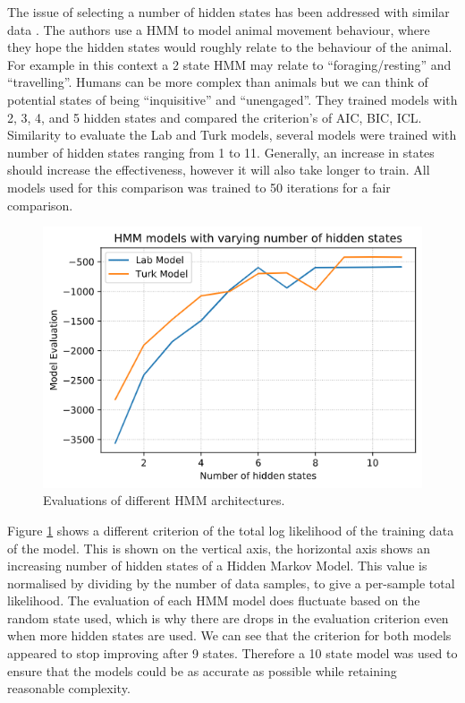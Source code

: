 \documentclass{article}
\begin{document}
The issue of selecting a number of hidden states has been addressed with similar data \cite{pohle2017selecting}.
The authors use a HMM to model animal movement behaviour, where they hope the hidden states would roughly relate to the behaviour of the animal.
For example in this context a 2 state HMM may relate to ``foraging/resting'' and ``travelling''.
Humans can be more complex than animals but we can think of potential states of being ``inquisitive'' and ``unengaged''.
They trained models with 2, 3, 4, and 5 hidden states and compared the criterion's of AIC, BIC, ICL.
Similarity to evaluate the Lab and Turk models, several models were trained with number of hidden states ranging from 1 to 11.
Generally, an increase in states should increase the effectiveness, however it will also take longer to train.
All models used for this comparison was trained to 50 iterations for a fair comparison. 

\begin{figure}[ht]
    \centering
    \includegraphics[scale=0.55]{Images/ModelEvaluation.png}
    \caption{Evaluations of different HMM architectures.}
    \label{fig:ModleEval}
\end{figure}

Figure \ref{fig:ModleEval} shows a different criterion of the total log likelihood of the training data of the model.
This is shown on the vertical axis, the horizontal axis shows an increasing number of hidden states of a Hidden Markov Model.
This value is normalised by dividing by the number of data samples, to give a per-sample total likelihood.
The evaluation of each HMM model does fluctuate based on the random state used, which is why there are drops in the evaluation criterion even when more hidden states are used.
We can see that the criterion for both models appeared to stop improving after 9 states.
Therefore a 10 state model was used to ensure that the models could be as accurate as possible while retaining reasonable complexity.
\end{document}
